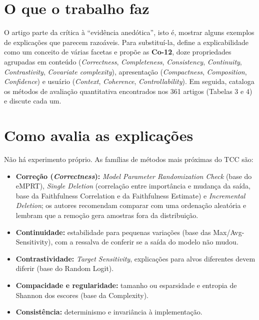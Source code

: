 \documentclass[11pt,a4paper]{article}
\begin{document}
\section{O que o trabalho faz}
O artigo parte da crítica à “evidência anedótica”, isto é, mostrar alguns exemplos de explicações que parecem razoáveis. Para substituí-la, define a explicabilidade como um conceito de várias facetas e propõe as \textbf{Co-12}, doze propriedades agrupadas em conteúdo (\textit{Correctness}, \textit{Completeness}, \textit{Consistency}, \textit{Continuity}, \textit{Contrastivity}, \textit{Covariate complexity}), apresentação (\textit{Compactness}, \textit{Composition}, \textit{Confidence}) e usuário (\textit{Context}, \textit{Coherence}, \textit{Controllability}). Em seguida, cataloga os métodos de avaliação quantitativa encontrados nos 361 artigos (Tabelas 3 e 4) e discute cada um.

\section{Como avalia as explicações}
Não há experimento próprio. As famílias de métodos mais próximas do TCC são:
\begin{itemize}
  \item \textbf{Correção (\textit{Correctness}):} \textit{Model Parameter Randomization Check} (base do eMPRT), \textit{Single Deletion} (correlação entre importância e mudança da saída, base da Faithfulness Correlation e da Faithfulness Estimate) e \textit{Incremental Deletion}; os autores recomendam comparar com uma ordenação aleatória e lembram que a remoção gera amostras fora da distribuição.
  \item \textbf{Continuidade:} estabilidade para pequenas variações (base das Max/Avg-Sensitivity), com a ressalva de conferir se a saída do modelo não mudou.
  \item \textbf{Contrastividade:} \textit{Target Sensitivity}, explicações para alvos diferentes devem diferir (base do Random Logit).
  \item \textbf{Compacidade e regularidade:} tamanho ou esparsidade e entropia de Shannon dos escores (base da Complexity).
  \item \textbf{Consistência:} determinismo e invariância à implementação.
\end{itemize}
\end{document}
